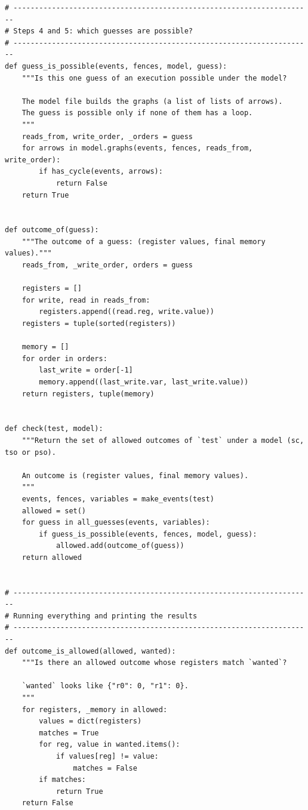 \begin{lstlisting}[style=vspython]
# ----------------------------------------------------------------------
# Steps 4 and 5: which guesses are possible?
# ----------------------------------------------------------------------
def guess_is_possible(events, fences, model, guess):
    """Is this one guess of an execution possible under the model?

    The model file builds the graphs (a list of lists of arrows).
    The guess is possible only if none of them has a loop.
    """
    reads_from, write_order, _orders = guess
    for arrows in model.graphs(events, fences, reads_from, write_order):
        if has_cycle(events, arrows):
            return False
    return True


def outcome_of(guess):
    """The outcome of a guess: (register values, final memory values)."""
    reads_from, _write_order, orders = guess

    registers = []
    for write, read in reads_from:
        registers.append((read.reg, write.value))
    registers = tuple(sorted(registers))

    memory = []
    for order in orders:
        last_write = order[-1]
        memory.append((last_write.var, last_write.value))
    return registers, tuple(memory)


def check(test, model):
    """Return the set of allowed outcomes of `test` under a model (sc, tso or pso).

    An outcome is (register values, final memory values).
    """
    events, fences, variables = make_events(test)
    allowed = set()
    for guess in all_guesses(events, variables):
        if guess_is_possible(events, fences, model, guess):
            allowed.add(outcome_of(guess))
    return allowed


# ----------------------------------------------------------------------
# Running everything and printing the results
# ----------------------------------------------------------------------
def outcome_is_allowed(allowed, wanted):
    """Is there an allowed outcome whose registers match `wanted`?

    `wanted` looks like {"r0": 0, "r1": 0}.
    """
    for registers, _memory in allowed:
        values = dict(registers)
        matches = True
        for reg, value in wanted.items():
            if values[reg] != value:
                matches = False
        if matches:
            return True
    return False



\end{lstlisting}
